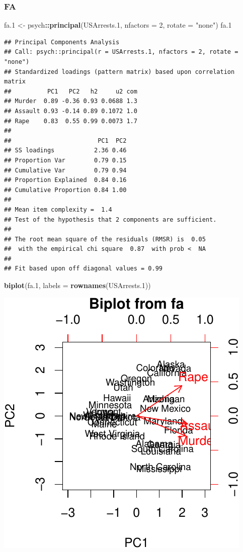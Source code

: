 \documentclass[]{book}
\newenvironment{Shaded}{\begin{snugshade}}{\end{snugshade}}
\newcommand{\KeywordTok}[1]{\textcolor[rgb]{0.13,0.29,0.53}{\textbf{#1}}}
\newcommand{\DataTypeTok}[1]{\textcolor[rgb]{0.13,0.29,0.53}{#1}}
\newcommand{\DecValTok}[1]{\textcolor[rgb]{0.00,0.00,0.81}{#1}}
\newcommand{\StringTok}[1]{\textcolor[rgb]{0.31,0.60,0.02}{#1}}
\newcommand{\OperatorTok}[1]{\textcolor[rgb]{0.81,0.36,0.00}{\textbf{#1}}}
\newcommand{\NormalTok}[1]{#1}
\theoremstyle{definition}
\theoremstyle{definition}
\theoremstyle{definition}
\theoremstyle{remark}
\begin{document}
\subsubsection{FA}\label{fa}

\begin{Shaded}
\begin{Highlighting}[]
\NormalTok{fa.}\DecValTok{1}\NormalTok{ <-}\StringTok{ }\NormalTok{psych}\OperatorTok{::}\KeywordTok{principal}\NormalTok{(USArrests.}\DecValTok{1}\NormalTok{, }\DataTypeTok{nfactors =} \DecValTok{2}\NormalTok{, }\DataTypeTok{rotate =} \StringTok{"none"}\NormalTok{)}
\NormalTok{fa.}\DecValTok{1}
\end{Highlighting}
\end{Shaded}

\begin{verbatim}
## Principal Components Analysis
## Call: psych::principal(r = USArrests.1, nfactors = 2, rotate = "none")
## Standardized loadings (pattern matrix) based upon correlation matrix
##          PC1   PC2   h2     u2 com
## Murder  0.89 -0.36 0.93 0.0688 1.3
## Assault 0.93 -0.14 0.89 0.1072 1.0
## Rape    0.83  0.55 0.99 0.0073 1.7
## 
##                        PC1  PC2
## SS loadings           2.36 0.46
## Proportion Var        0.79 0.15
## Cumulative Var        0.79 0.94
## Proportion Explained  0.84 0.16
## Cumulative Proportion 0.84 1.00
## 
## Mean item complexity =  1.4
## Test of the hypothesis that 2 components are sufficient.
## 
## The root mean square of the residuals (RMSR) is  0.05 
##  with the empirical chi square  0.87  with prob <  NA 
## 
## Fit based upon off diagonal values = 0.99
\end{verbatim}

\begin{Shaded}
\begin{Highlighting}[]
\KeywordTok{biplot}\NormalTok{(fa.}\DecValTok{1}\NormalTok{, }\DataTypeTok{labels =}  \KeywordTok{rownames}\NormalTok{(USArrests.}\DecValTok{1}\NormalTok{)) }
\end{Highlighting}
\end{Shaded}

\includegraphics[width=0.5\linewidth]{Rcourse_files/figure-latex/FA-1}
\end{document}
